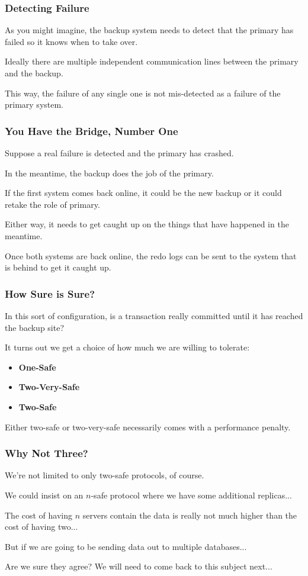\begin{frame}
\frametitle{Detecting Failure}

 As you might imagine, the backup system needs to detect that the primary has failed so it knows when to take over. 
 
 Ideally there are multiple independent communication lines between the primary and the backup.
 
This way, the failure of any single one is not mis-detected as a failure of the primary system.

\end{frame}


\begin{frame}
\frametitle{You Have the Bridge, Number One}

Suppose a real failure is detected and the primary has crashed. 

In the meantime, the backup does the job of the primary. 

If the first system comes back online, it could be the new backup or it could retake the role of primary. 

Either way, it needs to get caught up on the things that have happened in the meantime. 

Once both systems are back online, the redo logs can be sent to the system that is behind to get it caught up.

\end{frame}

\begin{frame}
\frametitle{How Sure is Sure?}

In this sort of configuration, is a transaction really committed until it has reached the backup site? 

It turns out we get a choice of how much we are willing to tolerate:

\begin{itemize}
	\item \textbf{One-Safe}
	\item \textbf{Two-Very-Safe}
	\item \textbf{Two-Safe}
\end{itemize}


Either two-safe or two-very-safe necessarily comes with a performance penalty.

\end{frame}


\begin{frame}
\frametitle{Why Not Three?}

We're not limited to only two-safe protocols, of course. 

We could insist on an $n$-safe protocol where we have some additional replicas... 

The cost of having $n$ servers contain the data is really not much higher than the cost of having two...

But if we are going to be sending data out to multiple databases... 

Are we sure they agree? We will need to come back to this subject next...


\end{frame}




